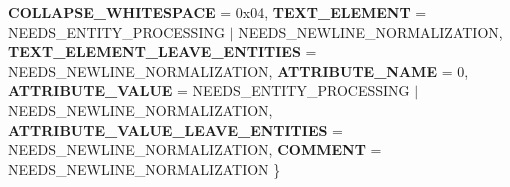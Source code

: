 \begin{DoxyCompactItemize}
{\bfseries C\+O\+L\+L\+A\+P\+S\+E\+\_\+\+W\+H\+I\+T\+E\+S\+P\+A\+CE} = 0x04, 
{\bfseries T\+E\+X\+T\+\_\+\+E\+L\+E\+M\+E\+NT} = N\+E\+E\+D\+S\+\_\+\+E\+N\+T\+I\+T\+Y\+\_\+\+P\+R\+O\+C\+E\+S\+S\+I\+NG $\vert$ N\+E\+E\+D\+S\+\_\+\+N\+E\+W\+L\+I\+N\+E\+\_\+\+N\+O\+R\+M\+A\+L\+I\+Z\+A\+T\+I\+ON, 
\newline
{\bfseries T\+E\+X\+T\+\_\+\+E\+L\+E\+M\+E\+N\+T\+\_\+\+L\+E\+A\+V\+E\+\_\+\+E\+N\+T\+I\+T\+I\+ES} = N\+E\+E\+D\+S\+\_\+\+N\+E\+W\+L\+I\+N\+E\+\_\+\+N\+O\+R\+M\+A\+L\+I\+Z\+A\+T\+I\+ON, 
{\bfseries A\+T\+T\+R\+I\+B\+U\+T\+E\+\_\+\+N\+A\+ME} = 0, 
{\bfseries A\+T\+T\+R\+I\+B\+U\+T\+E\+\_\+\+V\+A\+L\+UE} = N\+E\+E\+D\+S\+\_\+\+E\+N\+T\+I\+T\+Y\+\_\+\+P\+R\+O\+C\+E\+S\+S\+I\+NG $\vert$ N\+E\+E\+D\+S\+\_\+\+N\+E\+W\+L\+I\+N\+E\+\_\+\+N\+O\+R\+M\+A\+L\+I\+Z\+A\+T\+I\+ON, 
{\bfseries A\+T\+T\+R\+I\+B\+U\+T\+E\+\_\+\+V\+A\+L\+U\+E\+\_\+\+L\+E\+A\+V\+E\+\_\+\+E\+N\+T\+I\+T\+I\+ES} = N\+E\+E\+D\+S\+\_\+\+N\+E\+W\+L\+I\+N\+E\+\_\+\+N\+O\+R\+M\+A\+L\+I\+Z\+A\+T\+I\+ON, 
\newline
{\bfseries C\+O\+M\+M\+E\+NT} = N\+E\+E\+D\+S\+\_\+\+N\+E\+W\+L\+I\+N\+E\+\_\+\+N\+O\+R\+M\+A\+L\+I\+Z\+A\+T\+I\+ON
 \}
\end{DoxyCompactItemize}
